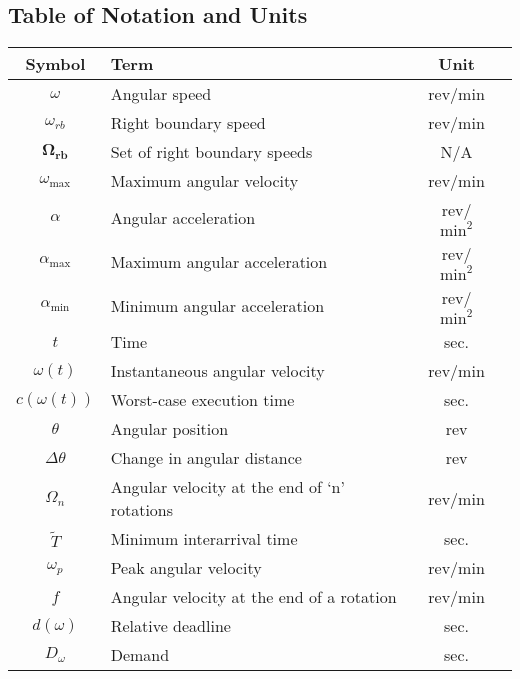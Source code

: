 \subsection{Table of Notation and Units} \label{appendix:table-of-notation}

\begin{center}
\bgroup
\begin{tabular}{| c | l | c | c |}
    
    \hline			
    Symbol & Term & Unit \\  \hline \hline \cline{1-3}
    $\omega$ & Angular speed & rev/min \\ \cline{1-3}
    $\omega_{rb}$ & Right boundary speed & rev/min \\ \cline{1-3}
    $\mathbf{\Omega_{rb}}$ & Set of right boundary speeds & N/A \\ \cline{1-3}
    $\omega_{\max}$ & Maximum angular velocity & rev/min \\ \cline{1-3}
    $\alpha$ & Angular acceleration & rev/$\text{min}^2$ \\ \cline{1-3}
    $\alpha_{\max}$ & Maximum angular acceleration & rev/$\text{min}^2$ \\ \cline{1-3}
    $\alpha_{\min}$ & Minimum angular acceleration & rev/$\text{min}^2$ \\ \cline{1-3}
    $t$ & Time & sec. \\ \cline{1-3}
    $\omega(t)$ & Instantaneous angular velocity & rev/min \\ \cline{1-3}
    $c(\omega(t))$ & Worst-case execution time & sec. \\ \cline{1-3}
    $\theta$ & Angular position & rev \\ \cline{1-3}
    $\Delta \theta$ & Change in angular distance & rev \\ \cline{1-3}
    $\Omega_n$ & Angular velocity at the end of `n' rotations & rev/min \\ \cline{1-3}
    $\tilde{T}$ & Minimum interarrival time & sec. \\ \cline{1-3}
    $\omega_p$ & Peak angular velocity & rev/min \\ \cline{1-3}
    $f$ & Angular velocity at the end of a rotation & rev/min \\ \cline{1-3}
    $d(\omega)$ & Relative deadline & sec. \\ \cline{1-3}
    $D_\omega$ & Demand & sec. \\ \cline{1-3}

\end{tabular}
\end{center}
